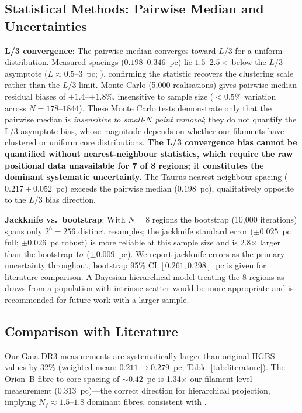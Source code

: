 \documentclass[twoside,twocolumn]{mnras}
\begin{document}
\subsection{Statistical Methods: Pairwise Median and Uncertainties}
\label{sec:statistics}

\textbf{L/3 convergence}: The pairwise median converges toward $L/3$ for a uniform
distribution. Measured spacings ($0.198$--$0.346$~pc) lie $1.5$--$2.5\times$ below the
$L/3$ asymptote ($L \approx 0.5$--$3$~pc; \citealt{Arzoumanian2019}), confirming the
statistic recovers the clustering scale rather than the $L/3$ limit. Monte Carlo
(5,000 realisations) gives pairwise-median residual biases of $+1.4$--$+1.8\%$,
insensitive to sample size ($<0.5\%$ variation across $N = 178$--$1844$). These
Monte Carlo tests demonstrate only that the pairwise median is \textit{insensitive to
small-$N$ point removal}; they do not quantify the L/3 asymptote bias, whose magnitude
depends on whether our filaments have clustered or uniform core distributions.
\textbf{The L/3 convergence bias cannot be quantified without nearest-neighbour
statistics, which require the raw positional data unavailable for 7 of 8 regions; it
constitutes the dominant systematic uncertainty.} The Taurus nearest-neighbour spacing
($0.217 \pm 0.052$~pc) exceeds the pairwise median ($0.198$~pc), qualitatively opposite
to the $L/3$ bias direction.

\textbf{Jackknife vs.\ bootstrap}: With $N = 8$ regions the bootstrap (10,000 iterations)
spans only $2^8 = 256$ distinct resamples; the jackknife standard error ($\pm 0.025$~pc
full; $\pm 0.026$~pc robust) is more reliable at this sample size and is 2.8$\times$
larger than the bootstrap $1\sigma$ ($\pm 0.009$~pc). We report jackknife errors as
the primary uncertainty throughout; bootstrap 95\% CI $[0.261, 0.298]$~pc is given for
literature comparison. A Bayesian hierarchical model treating the 8 regions as draws from
a population with intrinsic scatter would be more appropriate and is recommended for future
work with a larger sample.

\subsection{Comparison with Literature}

Our Gaia DR3 measurements are systematically larger than original HGBS values by 32\%
(weighted mean: $0.211 \to 0.279$~pc; Table~\ref{tab:literature}). The Orion~B
fibre-to-core spacing of ${\sim}0.42$~pc \citep{Yang2024} is 1.34$\times$ our
filament-level measurement ($0.313$~pc)---the correct direction for hierarchical
projection, implying $N_f \approx 1.5$--$1.8$ dominant fibres, consistent with
\citet{Hacar2018}. 
\end{document}
